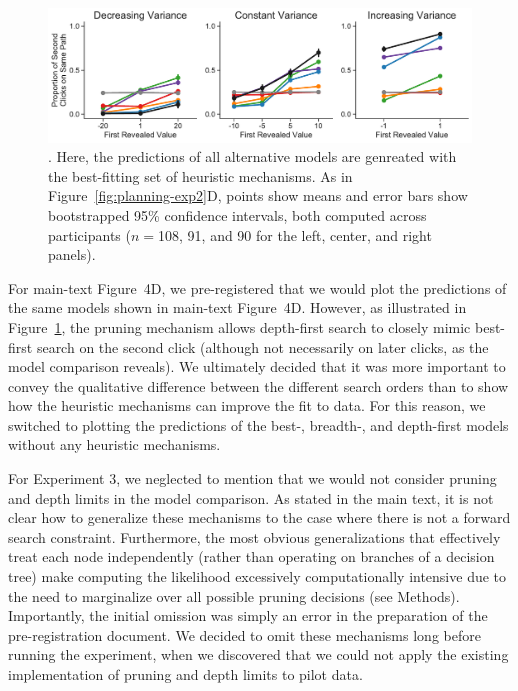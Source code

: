 \begin{figure}[t!]
    \centering
    \includegraphics[width=\textwidth]{figs/planning/second_click_alt.pdf}
    \caption{. Here, the predictions of all alternative models are genreated with the best-fitting set of heuristic mechanisms. As in Figure~\ref{fig:planning-exp2}D, points show means and error bars show bootstrapped 95\% confidence intervals, both computed across participants ($n=$108, 91, and 90 for the left, center, and right panels).
    }
    \label{fig:second_click_alt}
\end{figure}

For main-text Figure~4D, we pre-registered that we would plot the predictions of the same models shown in main-text Figure~4D. However, as illustrated in Figure~\ref{fig:second_click_alt}, the pruning mechanism allows depth-first search to closely mimic best-first search on the second click (although not necessarily on later clicks, as the model comparison reveals). We ultimately decided that it was more important to convey the qualitative difference between the different search orders than to show how the heuristic mechanisms can improve the fit to data. For this reason, we switched to plotting the predictions of the best-, breadth-, and depth-first models without any heuristic mechanisms.

For Experiment 3, we neglected to mention that we would not consider pruning and depth limits in the model comparison. As stated in the main text, it is not clear how to generalize these mechanisms to the case where there is not a forward search constraint. Furthermore, the most obvious generalizations that effectively treat each node independently (rather than operating on branches of a decision tree) make computing the likelihood excessively computationally intensive due to the need to marginalize over all possible pruning decisions (see Methods). Importantly, the initial omission was simply an error in the preparation of the pre-registration document. We decided to omit these mechanisms long before running the experiment, when we discovered that we could not apply the existing implementation of pruning and depth limits to pilot data.


